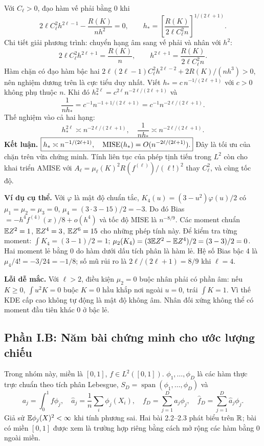 Với $C_\ell>0$, đạo hàm vế phải bằng 0 khi
\[
2\ell C_\ell^2h^{2\ell-1}-\frac{R(K)}{nh^2}=0,
\qquad h_*=
\left[\frac{R(K)}{2\ell C_\ell^2 n}\right]^{1/(2\ell+1)}.
\]
Chi tiết giải phương trình: chuyển hạng âm sang vế phải và nhân với $h^2$:
\[
2\ell C_\ell^2h^{2\ell+1}=\frac{R(K)}n,
\qquad h^{2\ell+1}=\frac{R(K)}{2\ell C_\ell^2n}.
\]
Hàm chặn có đạo hàm bậc hai
$2\ell(2\ell-1)C_\ell^2h^{2\ell-2}+2R(K)/(nh^3)>0$,
nên nghiệm dương trên là cực tiểu duy nhất.
Viết $h_*=c\,n^{-1/(2\ell+1)}$ với $c>0$ không phụ thuộc $n$.
Khi đó $h_*^{2\ell}=c^{2\ell}n^{-2\ell/(2\ell+1)}$ và
\[
\frac1{nh_*}=c^{-1}n^{-1+1/(2\ell+1)}
=c^{-1}n^{-2\ell/(2\ell+1)}.
\]
Thế nghiệm vào cả hai hạng:
\[
h_*^{2\ell}\asymp n^{-2\ell/(2\ell+1)},\quad
\frac1{nh_*}\asymp n^{-2\ell/(2\ell+1)}.
\]
\textbf{Kết luận.} $\boxed{h_*\asymp n^{-1/(2\ell+1)},\quad
\operatorname{MISE}(h_*)=O(n^{-2\ell/(2\ell+1)}).}$
Đây là tối ưu của chặn trên vừa chứng minh.
Tính liên tục của phép tịnh tiến trong $L^2$ còn cho khai triển AMISE với
$A_\ell=\mu_\ell(K)^2R(f^{(\ell)})/(\ell!)^2$ thay $C_\ell^2$,
và cùng tốc độ.

\textbf{Ví dụ cụ thể.} Với $\varphi$ là mật độ chuẩn tắc,
$K_4(u)=(3-u^2)\varphi(u)/2$ có
$\mu_1=\mu_2=\mu_3=0$, $\mu_4=(3\cdot3-15)/2=-3$.
Do đó Bias $=-h^4f^{(4)}(x)/8+o(h^4)$ và tốc độ MISE là $n^{-8/9}$.
Các moment chuẩn $\mathbb E Z^2=1$, $\mathbb E Z^4=3$, $\mathbb E Z^6=15$ cho những phép tính này.
Để kiểm tra từng moment: $\int K_4=(3-1)/2=1$;
$\mu_2(K_4)=(3\mathbb E Z^2-\mathbb E Z^4)/2=(3-3)/2=0$.
Hai moment lẻ bằng 0 do hàm dưới dấu tích phân là hàm lẻ.
Hệ số Bias bậc 4 là $\mu_4/4!=-3/24=-1/8$;
số mũ rủi ro là $2\ell/(2\ell+1)=8/9$ khi $\ell=4$.

\textbf{Lỗi dễ mắc.} Với $\ell>2$, điều kiện $\mu_2=0$ buộc nhân phải có phần âm:
nếu $K\geq0$, $\int u^2K=0$ buộc $K=0$ hầu khắp nơi ngoài $u=0$, trái $\int K=1$.
Vì thế KDE cấp cao không tự động là mật độ không âm.
Nhân đối xứng không thể có moment đầu tiên khác 0 ở bậc lẻ.

\subsection{Phần I.B: Năm bài chứng minh cho ước lượng chiếu}
Trong nhóm này, miền là $[0,1]$, $f\in L^2([0,1])$.
$\phi_1,\ldots,\phi_D$ là các hàm thực trực chuẩn theo tích phân Lebesgue,
$S_D=\operatorname{span}(\phi_1,\ldots,\phi_D)$ và
\[
a_j=\int_0^1f\phi_j,\quad \widehat a_j=\frac1n\sum_i\phi_j(X_i),\quad
f_D=\sum_{j=1}^Da_j\phi_j,\quad \widehat f_D=\sum_{j=1}^D\widehat a_j\phi_j.
\]
Giả sử $\mathbb E\phi_j(X)^2<\infty$ khi tính phương sai.
Hai bài 2.2--2.3 phát biểu trên $\mathbb R$; bài có miền $[0,1]$ được xem là trường hợp riêng
bằng cách mở rộng các hàm bằng 0 ngoài miền.

